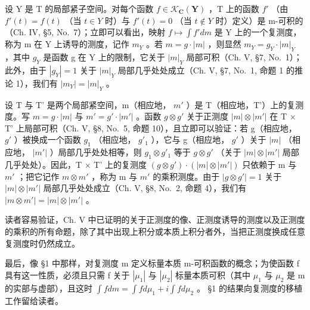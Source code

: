 设 Y 是 T 的局部紧子空间。对每个函数 \(f \in \mathcal{K}_{\mathbf{C}}(\mathbf{Y})\) ，T 上的函数 \(f'\) （由 \(f'(t) = f(t)\) （当 \(t \in Y\) 时）与 \(f'(t) = 0\) （当 \(t \notin Y\) 时）定义）是 m-可积的（Ch. IV, §5, No.~7）；立即可以看出，映射 \(f \mapsto \int f' dm\) 是 Y 上的一个复测度，称为 m 在 Y 上诱导的测度，记作 \(m_{Y}\) 。若 \(m = g \cdot |m|\) ，则显然 \(m_{Y} = g_{Y} \cdot |m|_{Y}\) ，其中 \(g_{Y}\) 是函数 g 在 Y 上的限制，它关于 \(|m|_{Y}\) 局部可积（Ch. V, §7, No.~1）；此外，由于 \(|g_{Y}| = 1\) 关于 \(|m|_{Y}\) 局部几乎处处成立（Ch. V, §7, No.~1, 命题 1 的推论 1），我们有 \(|m_{Y}| = |m|_{Y}\) 。

设 T 与 T' 是两个局部紧空间，m（相应地， \(m'\) ）是 T（相应地，T'）上的复测度。写 \(m = g \cdot |m|\) 与 \(m' = g' \cdot |m'|\) 。函数 \(g \otimes g'\) 关于正测度 \(|m| \otimes |m'|\) 在 T × T' 上局部可积（Ch. V, §8, No.~5, 命题 10），且立即可以验证：若 g（相应地， \(g'\) ）被换成一个函数 \(g_1\) （相应地， \(g'_1\) ），它与 g（相应地， \(g'\) ）关于 \(|m|\) （相应地， \(|m'|\) ）局部几乎处处相等，则 \(g_1 \otimes g'_1\) 等于 \(g \otimes g'\) （关于 \(|m| \otimes |m'|\) 局部几乎处处）。因此，T × T' 上的复测度 \((g \otimes g') \cdot (|m| \otimes |m'|)\) 只依赖于 m 与 \(m'\) ；把它记作 \(m \otimes m'\) ，称为 m 与 \(m'\) 的乘积测度。由于 \(|g \otimes g'| = 1\) 关于 \(|m| \otimes |m'|\) 局部几乎处处成立（Ch. V, §8, No.~2, 命题 4），我们有 \(|m \otimes m'| = |m| \otimes |m'|\) 。

读者容易验证，Ch. V 中已证明的关于正测度的像、正测度诱导的测度以及正测度的乘积的所有命题，除了其中出现上积分或本质上积分者外，当把正测度换成任意复测度时仍然成立。

最后，像 §1 中那样，对复测度 m 定义标量本质 m-可积函数的概念；为使函数 f 具有这一性质，必须且只需 f 关于 \(|\mu_{1}|\) 与 \(|\mu_{2}|\) 标量本质可积（其中 \(\mu_{1}\) 与 \(\mu_{2}\) 是 m 的实部与虚部），且这时 \(\int f dm = \int f d\mu_{1} + i \int f d\mu_{2}\) 。 §1 的结果向复测度的移植工作留给读者。

